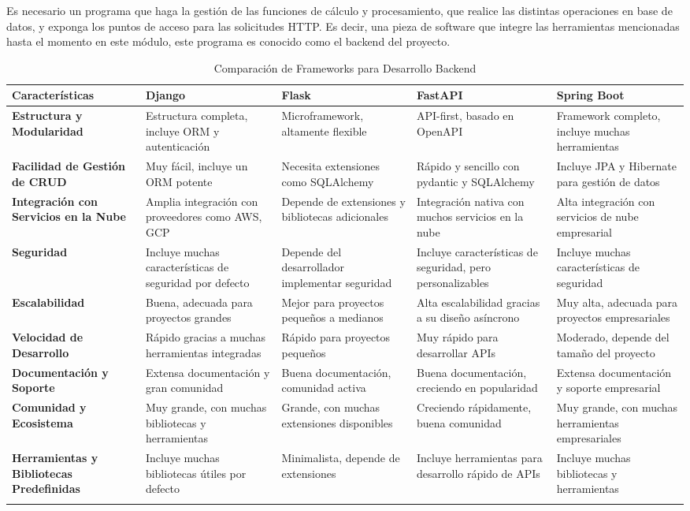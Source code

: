 Es necesario un programa que haga la gestión de las funciones de cálculo y procesamiento, que realice las distintas operaciones en base de datos, y exponga los puntos de acceso para las solicitudes HTTP. Es decir, una pieza de software que integre las herramientas mencionadas hasta el momento en este módulo, este programa es conocido como el backend del proyecto. \\
%
\begin{longtable}{|m{3cm}|m{3cm}|m{3cm}|m{3cm}|m{3cm}|}
\hline
\textbf{Características} & \textbf{Django} & \textbf{Flask} & \textbf{FastAPI} & \textbf{Spring Boot} \\
\hline
\textbf{Estructura y Modularidad} & Estructura completa, incluye ORM y autenticación & Microframework, altamente flexible & API-first, basado en OpenAPI & Framework completo, incluye muchas herramientas \\
\hline
\textbf{Facilidad de Gestión de CRUD} & Muy fácil, incluye un ORM potente & Necesita extensiones como SQLAlchemy & Rápido y sencillo con pydantic y SQLAlchemy & Incluye JPA y Hibernate para gestión de datos \\
\hline
\textbf{Integración con Servicios en la Nube} & Amplia integración con proveedores como AWS, GCP & Depende de extensiones y bibliotecas adicionales & Integración nativa con muchos servicios en la nube & Alta integración con servicios de nube empresarial \\
\hline
\textbf{Seguridad} & Incluye muchas características de seguridad por defecto & Depende del desarrollador implementar seguridad & Incluye características de seguridad, pero personalizables & Incluye muchas características de seguridad \\
\hline
\textbf{Escalabilidad} & Buena, adecuada para proyectos grandes & Mejor para proyectos pequeños a medianos & Alta escalabilidad gracias a su diseño asíncrono & Muy alta, adecuada para proyectos empresariales \\
\hline
\textbf{Velocidad de Desarrollo} & Rápido gracias a muchas herramientas integradas & Rápido para proyectos pequeños & Muy rápido para desarrollar APIs & Moderado, depende del tamaño del proyecto \\
\hline
\textbf{Documentación y Soporte} & Extensa documentación y gran comunidad & Buena documentación, comunidad activa & Buena documentación, creciendo en popularidad & Extensa documentación y soporte empresarial \\
\hline
\textbf{Comunidad y Ecosistema} & Muy grande, con muchas bibliotecas y herramientas & Grande, con muchas extensiones disponibles & Creciendo rápidamente, buena comunidad & Muy grande, con muchas herramientas empresariales \\
\hline
\textbf{Herramientas y Bibliotecas Predefinidas} & Incluye muchas bibliotecas útiles por defecto & Minimalista, depende de extensiones & Incluye herramientas para desarrollo rápido de APIs & Incluye muchas bibliotecas y herramientas \\
\hline
\caption{Comparación de Frameworks para Desarrollo Backend}
\label{tab
}
\end{longtable}
